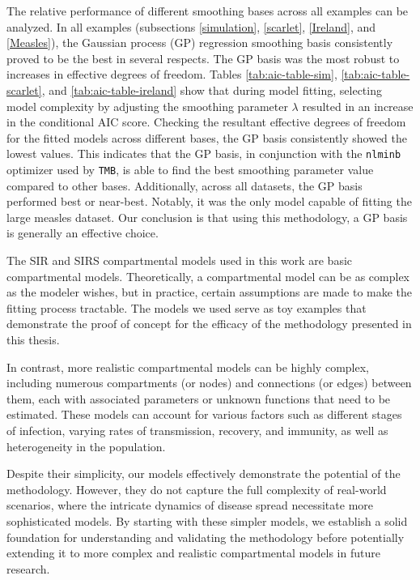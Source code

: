 \documentclass[
11pt, %
oneside, %
english, %
singlespacing, %
]{macthesis} %
\begin{document}
The relative performance of different smoothing bases across all examples can be analyzed. In all examples (subsections \ref{simulation}, \ref{scarlet}, \ref{Ireland}, and \ref{Measles}), the Gaussian process (GP) regression smoothing basis consistently proved to be the best in several respects. The GP basis was the most robust to increases in effective degrees of freedom. Tables \ref{tab:aic-table-sim}, \ref{tab:aic-table-scarlet}, and \ref{tab:aic-table-ireland} show that during model fitting, selecting model complexity by adjusting the smoothing parameter \(\lambda\) resulted in an increase in the conditional AIC score. Checking the resultant effective degrees of freedom for the fitted models across different bases, the GP basis consistently showed the lowest values. This indicates that the GP basis, in conjunction with the \texttt{nlminb} optimizer used by \texttt{TMB}, is able to find the best smoothing parameter value compared to other bases. Additionally, across all datasets, the GP basis performed best or near-best. Notably, it was the only model capable of fitting the large measles dataset. Our conclusion is that using this methodology, a GP basis is generally an effective choice.

The SIR and SIRS compartmental models used in this work are basic compartmental models. Theoretically, a compartmental model can be as complex as the modeler wishes, but in practice, certain assumptions are made to make the fitting process tractable. The models we used serve as toy examples that demonstrate the proof of concept for the efficacy of the methodology presented in this thesis.

In contrast, more realistic compartmental models can be highly complex, including numerous compartments (or nodes) and connections (or edges) between them, each with associated parameters or unknown functions that need to be estimated. These models can account for various factors such as different stages of infection, varying rates of transmission, recovery, and immunity, as well as heterogeneity in the population.

Despite their simplicity, our models effectively demonstrate the potential of the methodology. However, they do not capture the full complexity of real-world scenarios, where the intricate dynamics of disease spread necessitate more sophisticated models. By starting with these simpler models, we establish a solid foundation for understanding and validating the methodology before potentially extending it to more complex and realistic compartmental models in future research.
\end{document}
